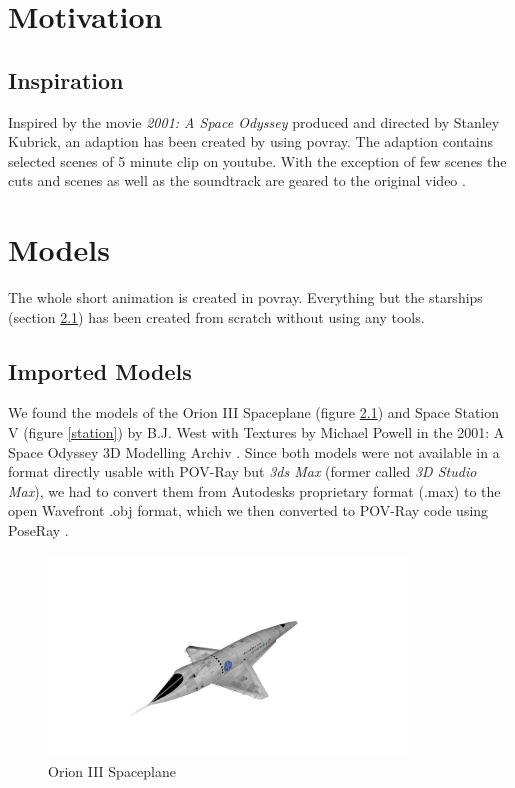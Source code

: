 
\chapter{Motivation}
\section{Inspiration}
Inspired by the movie \textit{2001: A Space Odyssey} produced and directed by Stanley Kubrick, an adaption has been created by using povray. The adaption contains selected scenes of 5 minute clip on youtube.  With the exception of few scenes the cuts and scenes as well as the soundtrack are geared to the original video  \cite{EbClectic}.

\chapter{Models}
The whole short animation is created in povray. Everything but the starships (section \ref{imported_models}) has been created from scratch without using any tools.

\section{Imported Models} \label{imported_models}

We found the models of the Orion III Spaceplane (figure \ref{orion}) and Space Station V (figure \ref{station}) by B.J. West with Textures by Michael Powell in the 2001: A Space Odyssey 3D Modelling Archiv \cite{Archive}.
Since both models were not available in a format directly usable with POV-Ray but \textit{3ds Max} (former called \textit{3D Studio Max}), we had to convert them from Autodesks proprietary format (.max) to the open Wavefront .obj format, which we then converted to POV-Ray code using PoseRay \cite{PoseRay}.

\begin{figure}[ht]
	\centering
	\includegraphics[width=0.85\textwidth]{images/orion.jpg}
	\caption{Orion III Spaceplane}
	\label{orion}
\end{figure}


